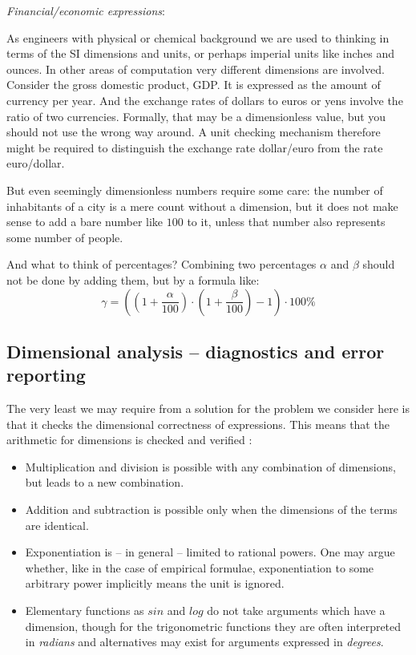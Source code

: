\documentclass{article}
\begin{document}
\vspace{\baselineskip}
\noindent \emph{Financial/economic expressions}:

\noindent As engineers with physical or chemical background we are used to thinking in terms of the SI dimensions and units, or
perhaps imperial units like inches and ounces. In other areas of computation very different dimensions are involved.
Consider the gross domestic product, GDP. It is expressed as the amount of currency per year. And the
exchange rates of dollars to euros or yens involve the ratio of two currencies. Formally, that may be a dimensionless
value, but you should not use the wrong way around. A unit checking mechanism therefore might be required to
distinguish the exchange rate dollar/euro from the rate euro/dollar.

But even seemingly dimensionless numbers require some care: the number of inhabitants of a city is a mere count without
a dimension, but it does not make sense to add a bare number like $100$ to it, unless that number also represents some
number of people.

And what to think of percentages? Combining two percentages $\alpha$ and $\beta$ should not be done by adding them, but by
a formula like:
\begin{equation}
    \gamma = ((1 + \frac{\alpha}{100}) \cdot (1 + \frac{\beta}{100}) - 1) \cdot 100\%
\end{equation}

\subsection*{Dimensional analysis -- diagnostics and error reporting}

The very least we may require from a solution for the problem we consider here is that it checks the dimensional correctness
of expressions. This means that the arithmetic for dimensions is checked and verified \cite{DimensionalAnalysis}:
\begin{itemize}
\item
Multiplication and division is possible with any combination of dimensions, but leads to a new combination.
\item
Addition and subtraction is possible only when the dimensions of the terms are identical.
\item
Exponentiation is -- in general -- limited to rational powers. One may argue whether, like in the case of empirical
formulae, exponentiation to some arbitrary power implicitly means the unit is ignored.
\item
Elementary functions as $sin$ and $log$ do not take arguments which have a dimension, though for the trigonometric functions
they are often interpreted in \emph{radians} and alternatives may exist for arguments expressed in \emph{degrees}.
\end{itemize}
\end{document}
